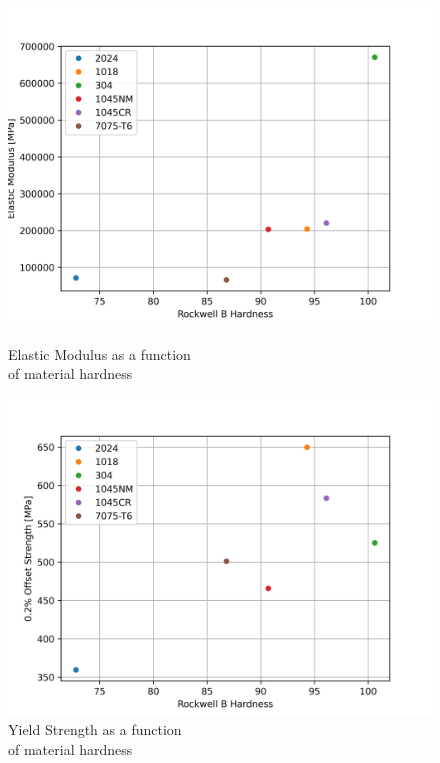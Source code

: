\documentclass{article}
\begin{document}
\begin{figure}[!h!] 
  \label{fig:q3} 
  \begin{minipage}[b]{0.5\linewidth}
    \centering
    \includegraphics[width=\linewidth]{plots/q3_E.png} 
    \caption{Elastic Modulus as a function \\  of material hardness} 
    \vspace{4ex}
  \end{minipage}
  \begin{minipage}[b]{0.5\linewidth}
    \centering
    \includegraphics[width=\linewidth]{plots/q3_offstr.png} 
    \caption{Yield Strength as a function \\ of material hardness} 
    \vspace{4ex}

\end{minipage}
\end{figure}
\end{document}
